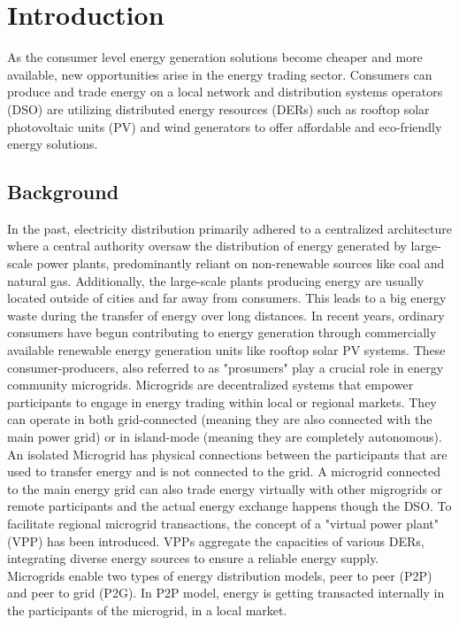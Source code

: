 \chapter{Introduction} \label{introduction}
As the consumer level energy generation solutions become cheaper and more available, new opportunities arise in the energy trading sector. Consumers can produce and trade energy on a 
local network and distribution systems operators (DSO) are utilizing distributed energy resources (DERs) such as rooftop solar photovoltaic units (PV) and wind generators to offer affordable and eco-friendly energy 
solutions.
\section{Background}
In the past, electricity distribution primarily adhered to a centralized architecture where a central authority oversaw the distribution of energy generated by 
large-scale power plants, predominantly reliant on non-renewable sources like coal and natural gas. Additionally, the large-scale plants producing energy are usually located outside of
cities and far away from consumers. This leads to a big energy waste during the transfer of energy over long distances.
In recent years, ordinary consumers have begun contributing to energy generation through commercially available renewable energy generation units like rooftop solar PV systems. These consumer-producers, also referred 
to as "prosumers" play a crucial role in energy community microgrids. Microgrids are decentralized systems that empower participants to engage in energy trading within local or regional markets. 
They can operate in both grid-connected (meaning they are also connected with the main power grid) or in island-mode (meaning they are completely 
autonomous). An isolated Microgrid has physical connections between the participants that are used to transfer energy and is not connected to the grid. A microgrid connected to the main 
energy grid can also trade energy virtually with other migrogrids or remote participants and the actual energy exchange happens though the DSO.
To facilitate regional microgrid transactions, the concept of a "virtual power plant" (VPP) has been introduced. VPPs aggregate the capacities of various DERs, integrating diverse energy 
sources to ensure a reliable energy supply. \cite{Pipattanasomporn2013,cali2019towards,BrooklynMicrogrid}\\
Microgrids enable two types of energy distribution models, peer to peer (P2P) and peer to grid (P2G).
In P2P model, energy is getting transacted internally in the participants of the microgrid, in a local market.
